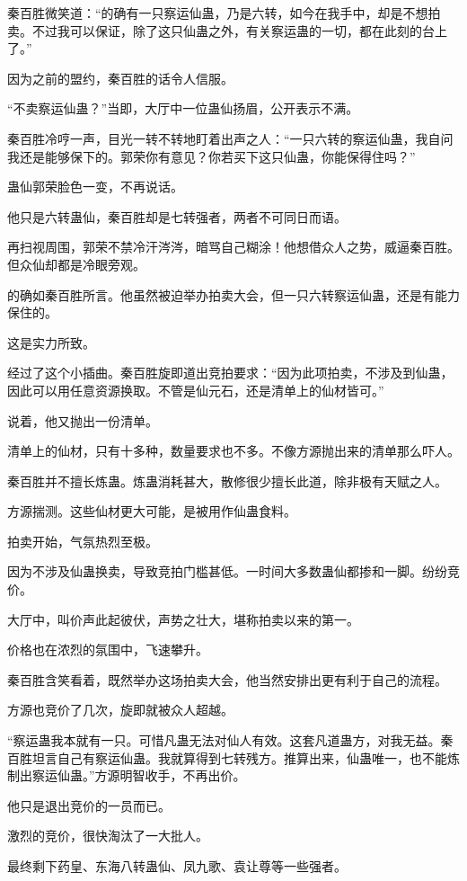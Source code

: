 \begin{this_body}
秦百胜微笑道：“的确有一只察运仙蛊，乃是六转，如今在我手中，却是不想拍卖。不过我可以保证，除了这只仙蛊之外，有关察运蛊的一切，都在此刻的台上了。”

因为之前的盟约，秦百胜的话令人信服。

“不卖察运仙蛊？”当即，大厅中一位蛊仙扬眉，公开表示不满。

秦百胜冷哼一声，目光一转不转地盯着出声之人：“一只六转的察运仙蛊，我自问我还是能够保下的。郭荣你有意见？你若买下这只仙蛊，你能保得住吗？”

蛊仙郭荣脸色一变，不再说话。

他只是六转蛊仙，秦百胜却是七转强者，两者不可同日而语。

再扫视周围，郭荣不禁冷汗涔涔，暗骂自己糊涂！他想借众人之势，威逼秦百胜。但众仙却都是冷眼旁观。

的确如秦百胜所言。他虽然被迫举办拍卖大会，但一只六转察运仙蛊，还是有能力保住的。

这是实力所致。

经过了这个小插曲。秦百胜旋即道出竞拍要求：“因为此项拍卖，不涉及到仙蛊，因此可以用任意资源换取。不管是仙元石，还是清单上的仙材皆可。”

说着，他又抛出一份清单。

清单上的仙材，只有十多种，数量要求也不多。不像方源抛出来的清单那么吓人。

秦百胜并不擅长炼蛊。炼蛊消耗甚大，散修很少擅长此道，除非极有天赋之人。

方源揣测。这些仙材更大可能，是被用作仙蛊食料。

拍卖开始，气氛热烈至极。

因为不涉及仙蛊换卖，导致竞拍门槛甚低。一时间大多数蛊仙都掺和一脚。纷纷竞价。

大厅中，叫价声此起彼伏，声势之壮大，堪称拍卖以来的第一。

价格也在浓烈的氛围中，飞速攀升。

秦百胜含笑看着，既然举办这场拍卖大会，他当然安排出更有利于自己的流程。

方源也竞价了几次，旋即就被众人超越。

“察运蛊我本就有一只。可惜凡蛊无法对仙人有效。这套凡道蛊方，对我无益。秦百胜坦言自己有察运仙蛊。我就算得到七转残方。推算出来，仙蛊唯一，也不能炼制出察运仙蛊。”方源明智收手，不再出价。

他只是退出竞价的一员而已。

激烈的竞价，很快淘汰了一大批人。

最终剩下药皇、东海八转蛊仙、凤九歌、袁让尊等一些强者。


\end{this_body}
